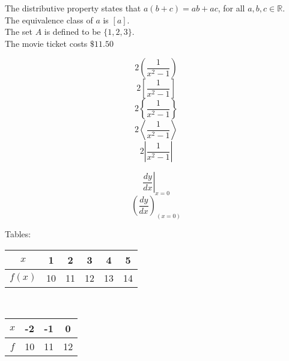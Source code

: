 \documentclass[]{article}
\begin{document}
The distributive property states that $a(b+c) = ab+ac$, for all $a,b,c \in \mathbb{R}$.\\[6pt]
The equivalence class of $a$ is $[a]$.\\[6pt]
The set $A$ is defined to be $\{1,2,3\}$.\\[6pt]
The movie ticket costs $\$11.50$

$$2\left( \frac{1}{x^2-1} \right)$$
$$2\left[ \frac{1}{x^2-1} \right]$$
$$2\left\{ \frac{1}{x^2-1} \right\}$$
$$2\left\langle \frac{1}{x^2-1}  \right\rangle$$
$$2\left| \frac{1}{x^2-1}  \right| $$

$$ \left. \frac{dy}{dx} \right|_{x = 0} $$
$$ \left( \frac{dy}{dx} \right)_{\left( x = 0 \right) } $$

Tables:\\

\begin{tabular}{|c|c|c|c|c|c|}
\hline
$x$ & 1 & 2 & 3 & 4 & 5 \\ \hline
$f(x)$ & 10 & 11 & 12 & 13 & 14 \\ \hline 
\end{tabular}
\vspace{1cm}\\
\begin{tabular}{|c|c|c|c|}
\hline
$x$ & -2 & -1 & 0 \\ \hline
$f$ & 10 & 11 & 12 \\ \hline
\end{tabular}
\end{document}
